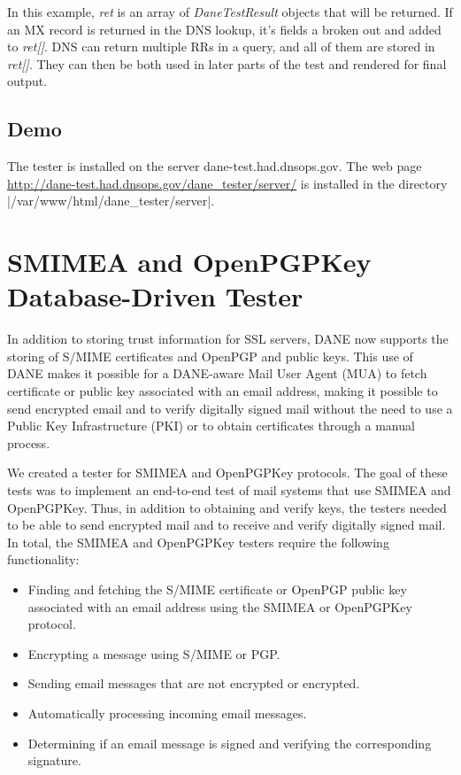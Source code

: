 \documentclass[preprint,3p]{elsarticle}
\begin{document}
In this example, \emph{ret} is an array of \emph{DaneTestResult}
objects that will be returned. If an MX record is returned in the DNS
lookup, it's fields a broken out and added to \emph{ret[]}. DNS can
return multiple RRs in a query, and all of them are stored in
\emph{ret[]}.  They can then be both used in later parts of the test
and rendered for final output.

\subsection{Demo}
The tester is installed on the server dane-test.had.dnsops.gov. The
web page \url{http://dane-test.had.dnsops.gov/dane_tester/server/} is installed in the
directory |/var/www/html/dane_tester/server|.

\section{SMIMEA and OpenPGPKey Database-Driven Tester}
In addition to storing trust information for SSL servers, DANE now
supports the storing of S/MIME certificates and OpenPGP and public keys. This use
of DANE makes it possible for a DANE-aware Mail User Agent (MUA) to
fetch certificate or public key associated with an email address,
making it possible to send encrypted email and to verify digitally
signed mail without the need to use a Public Key Infrastructure (PKI)
or to obtain certificates through a manual process.

We created a tester for SMIMEA and OpenPGPKey protocols. The goal of
these tests was to implement an end-to-end test of mail systems that
use SMIMEA and OpenPGPKey. Thus, in addition to obtaining and verify
keys, the testers needed to be able to send encrypted mail and to
receive and verify digitally signed mail. In total, the 
SMIMEA and OpenPGPKey testers require the following functionality:

\begin{itemize}
\item Finding and fetching the S/MIME certificate or OpenPGP public
  key associated with an email address using the SMIMEA or OpenPGPKey
  protocol.
\item Encrypting a message using S/MIME or PGP.
\item Sending email messages that are not encrypted or encrypted.
\item Automatically processing incoming email messages.
\item Determining if an email message is signed and verifying the
  corresponding signature. 
\end{itemize}
\end{document}
